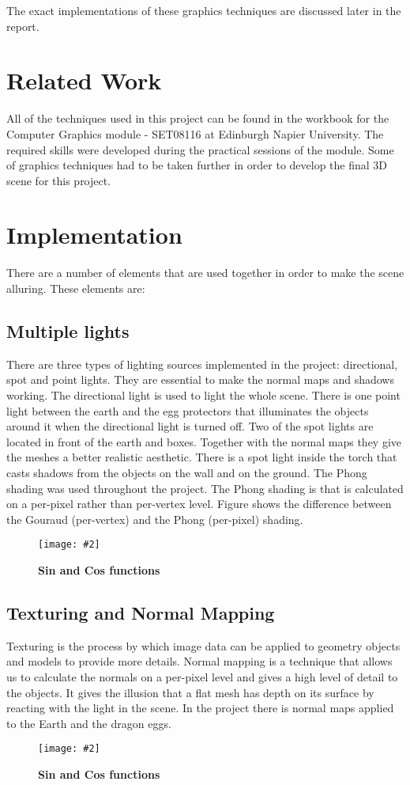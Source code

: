 \documentclass[10pt, a4paper]{article}
\newcommand{\figuremacro}[5]{
    \begin{figure}[#1]
        \centering
        \texttt{[image: \#2]}
        \caption[#3]{\textbf{#3}#4}
        \label{fig:#2}
    \end{figure}
}
\begin{document}
    The exact implementations of these graphics techniques are discussed later in the report.
	
	\section{Related Work}
	
	All of the techniques used in this project can be found in the workbook for the Computer Graphics module - SET08116 at Edinburgh Napier University\cite{book}. The required skills were developed during the practical sessions of the module. Some of graphics techniques had to be taken further in order to develop the final 3D scene for this project.
	
	\section{Implementation}
		
	There are a number of elements that are used together in order to make the scene alluring. These elements are:

	\subsection{Multiple lights}
	There are three types of lighting sources implemented in the project: directional, spot and point lights. They are essential to make the normal maps and shadows working. The directional light is used to light the whole scene. There is one point light between the earth and the egg protectors that illuminates the objects around it when the directional light is turned off. Two of the spot lights are located in front of the earth and boxes. Together with the normal maps they give the meshes a better realistic aesthetic. There is a spot light inside the torch that casts shadows from the objects on the wall and on the ground. The Phong shading was used throughout the project. The Phong shading is that is calculated on a per-pixel rather than per-vertex level. Figure shows the difference between the Gouraud (per-vertex) and the Phong (per-pixel) shading.
	\figuremacro{h}{phongAndGouraud}{Sin and Cos functions}{ }{1.0}	
	\subsection{Texturing and Normal Mapping}
	Texturing is the process by which image data can be applied to geometry objects and models to provide more details. 
    Normal mapping is a technique that allows us to calculate the normals on a per-pixel level and gives a high level of detail to the objects. It gives the illusion that a flat mesh has depth on its surface by reacting with the light in the scene. In the project there is normal maps applied to the Earth and the dragon eggs. 
   	\figuremacro{h}{normalMaps}{Sin and Cos functions}{ }{1.0}	
\end{document}
